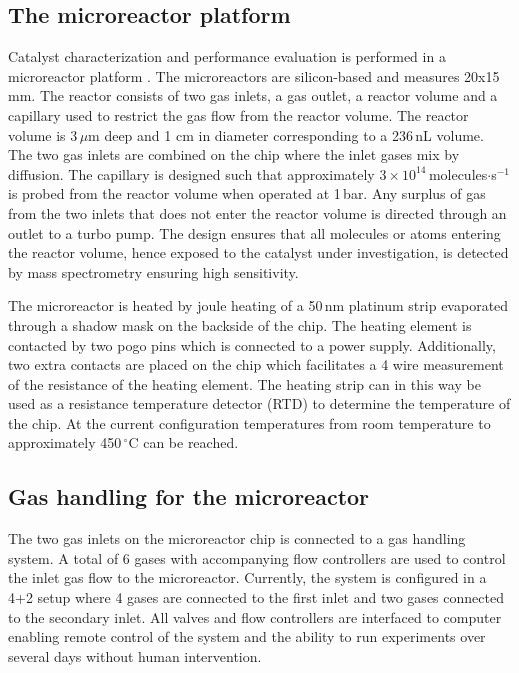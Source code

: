\documentclass[aip,rsi]{revtex4-1}
\begin{document}
\subsection{The microreactor platform}
Catalyst characterization and performance evaluation is performed in a microreactor platform \cite{Henriksen2009}. The microreactors are silicon-based and measures 20x15\,mm. The reactor consists of two gas inlets, a gas outlet, a reactor volume and a capillary used to restrict the gas flow from the reactor volume. The reactor volume is 3\,$\mu$m deep and 1 cm in diameter corresponding to a 236\,nL volume. The two gas inlets are combined on the chip where the inlet gases mix by diffusion. The capillary is designed such that approximately $3\times10^{14}$\,molecules$\cdot$s$^{-1}$ is probed from the reactor volume when operated at 1\,bar. Any surplus of gas from the two inlets that does not enter the reactor volume is directed through an outlet to a turbo pump. The design ensures that all molecules or atoms entering the reactor volume, hence exposed to the catalyst under investigation, is detected by mass spectrometry ensuring high sensitivity.

The microreactor is heated by joule heating of a 50\,nm platinum strip evaporated through a shadow mask on the backside of the chip. The heating element is contacted by two pogo pins which is connected to a power supply. Additionally, two extra contacts are placed on the chip which facilitates a 4 wire measurement of the resistance of the heating element. The heating strip can in this way be used as a resistance temperature detector (RTD) to determine the temperature of the chip. At the current configuration temperatures from room temperature to approximately 450\,$^{\circ}$C can be reached.


\subsection{Gas handling for the microreactor}
The two gas inlets on the microreactor chip is connected to a gas handling system. A total of 6 gases with accompanying flow controllers are used to control the inlet gas flow to the microreactor. Currently, the system is configured in a 4+2 setup where 4 gases are connected to the first inlet and two gases connected to the secondary inlet. All valves and flow controllers are interfaced to computer enabling remote control of the system and the ability to run experiments over several days without human intervention.
\end{document}
